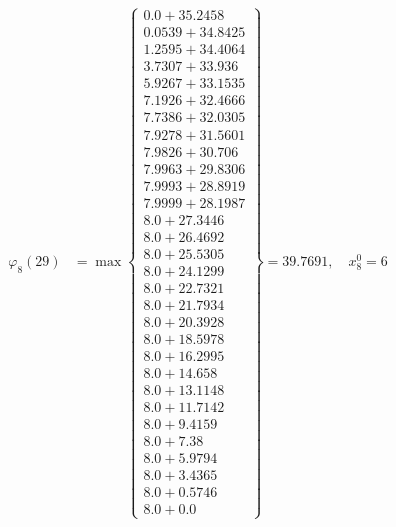 \documentclass{article}
\begin{document}
\begin{align*}
  
\varphi_{8}(29) &= \max \left\{ \begin{array}{c}
0.0 + 35.2458 \\
 0.0539 + 34.8425 \\
 1.2595 + 34.4064 \\
 3.7307 + 33.936 \\
 5.9267 + 33.1535 \\
 7.1926 + 32.4666 \\
 7.7386 + 32.0305 \\
 7.9278 + 31.5601 \\
 7.9826 + 30.706 \\
 7.9963 + 29.8306 \\
 7.9993 + 28.8919 \\
 7.9999 + 28.1987 \\
 8.0 + 27.3446 \\
 8.0 + 26.4692 \\
 8.0 + 25.5305 \\
 8.0 + 24.1299 \\
 8.0 + 22.7321 \\
 8.0 + 21.7934 \\
 8.0 + 20.3928 \\
 8.0 + 18.5978 \\
 8.0 + 16.2995 \\
 8.0 + 14.658 \\
 8.0 + 13.1148 \\
 8.0 + 11.7142 \\
 8.0 + 9.4159 \\
 8.0 + 7.38 \\
 8.0 + 5.9794 \\
 8.0 + 3.4365 \\
 8.0 + 0.5746 \\
 8.0 + 0.0
\end{array} \right\}=39.7691,\quad x_{8}^0=6\\
  
  
  

\end{align*}
\end{document}

